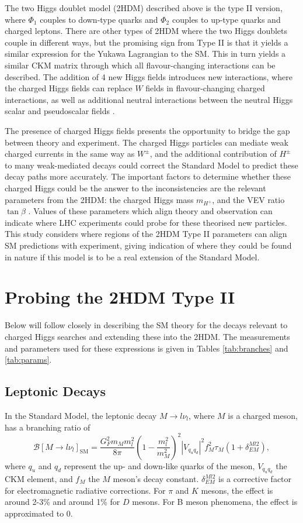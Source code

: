 \documentclass[a4paper,12pt]{article}
\begin{document}
The two Higgs doublet model (2HDM) described above is the type II version, where $\Phi_1$ couples to down-type quarks and $\Phi_2$ couples to up-type quarks and charged leptons. 
There are other types of 2HDM where the two Higgs doublets couple in different ways, but the promising sign from Type II is that it yields a similar expression for the Yukawa Lagrangian to the SM. 
This in turn yields a similar CKM matrix through which all flavour-changing interactions can be described. 
The addition of 4 new Higgs fields introduces new interactions, where the charged Higgs fields can replace $W$ fields in flavour-changing charged interactions, as well as additional neutral interactions between the neutral Higgs scalar and pseudoscalar fields \cite{s}. 

The presence of charged Higgs fields presents the opportunity to bridge the gap between theory and experiment. 
The charged Higgs particles can mediate weak charged currents in the same way as $W^{\pm}$, and the additional contribution of $H^{\pm}$ to many weak-mediated decays could correct the Standard Model to predict these decay paths \cite{s} more accurately. 
The important factors to determine whether these charged Higgs could be the answer to the inconsistencies are the relevant parameters from the 2HDM: the charged Higgs mass $m_{H^+}$, and the VEV ratio $\tan\beta$ \cite{a}. 
Values of these parameters which align theory and observation can indicate where LHC experiments could probe for these theorised new particles. 
This study considers where regions of the 2HDM Type II parameters can align SM predictions with experiment, giving indication of where they could be found in nature if this model is to be a real extension of the Standard Model.

\section{Probing the 2HDM Type II}
\label{sec:probe}
Below will follow \cite{a} closely in describing the SM theory for the decays relevant to charged Higgs searches and extending these into the 2HDM. 
The measurements and parameters used for these expressions is given in Tables \ref{tab:branches} and \ref{tab:params}.

\subsection{Leptonic Decays}
\label{subsec:lep}
In the Standard Model, the leptonic decay $M\to l\nu_l$, where $M$ is a charged meson, has a branching ratio of
\begin{equation}
    \label{eq:mlv}
    \mathcal{B}[M\to l\nu_l]_{\text{SM}} = \frac{G_F^2m_Mm_l^2}{8\pi}\left(1-\frac{m_l^2}{m_M^2}\right)^2 |V_{q_uq_d}|^2f_M^2\tau_M(1+\delta_{EM}^{Ml2}),
\end{equation}
where $q_u$ and $q_d$ represent the up- and down-like quarks of the meson, $V_{q_uq_d}$ the CKM element, and $f_M$ the $M$ meson's decay constant.
$\delta_{EM}^{Ml2}$ is a corrective factor for electromagnetic radiative corrections. 
For $\pi$ and $K$ mesons, the effect is around 2-3\% and around 1\% for $D$ mesons.
For B meson phenomena, the effect is approximated to 0. 
\end{document}

